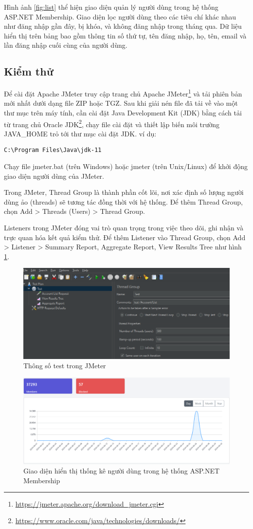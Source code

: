 \documentclass{article}[14pt]
\begin{document}
Hình ảnh \ref{fig:list} thể hiện giao diện quản lý người dùng trong hệ thống ASP.NET Membership. Giao diện lọc người dùng theo các tiêu chí khác nhau như đăng nhập gần đây, bị khóa, và không đăng nhập trong tháng qua. Dữ liệu hiển thị trên bảng bao gồm thông tin số thứ tự, tên đăng nhập, họ, tên, email và lần đăng nhập cuối cùng của người dùng.

\subsection{Kiểm thử}

Để cài đặt Apache JMeter truy cập trang chủ Apache JMeter\footnote{\url{https://jmeter.apache.org/download_jmeter.cgi}} và tải phiên bản mới nhất dưới dạng file ZIP hoặc TGZ. Sau khi giải nén file đã tải về vào một thư mục trên máy tính, cần cài đặt Java Development Kit (JDK) bằng cách tải từ trang chủ Oracle JDK\footnote{\url{https://www.oracle.com/java/technologies/downloads/}}, chạy file cài đặt và thiết lập biến môi trường JAVA\_HOME trỏ tới thư mục cài đặt JDK. ví dụ: \begin{verbatim}C:\Program Files\Java\jdk-11\end{verbatim}

Chạy file jmeter.bat (trên Windows) hoặc jmeter (trên Unix/Linux) để khởi động giao diện người dùng của JMeter.

Trong JMeter, Thread Group là thành phần cốt lõi, nơi xác định số lượng người dùng ảo (threads) sẽ tương tác đồng thời với hệ thống. Để thêm Thread Group, chọn Add > Threads (Users) > Thread Group.

Listeners trong JMeter đóng vai trò quan trọng trong việc theo dõi, ghi nhận và trực quan hóa kết quả kiểm thử. Để thêm Listener vào Thread Group, chọn Add > Listener > Summary Report, Aggregate Report, View Results Tree như hình \ref{fig:testjmeter}.


\begin{figure}
    \centering
    \includegraphics[width=0.5\linewidth]{images/testjmeter.png}
    \caption{Thông số test trong JMeter}
    \label{fig:testjmeter}
\end{figure}

\begin{figure}
    \centering
    \includegraphics[width=0.5\linewidth]{images/day.png}
    \caption{Giao diện hiển thị thống kê người dùng trong hệ thống ASP.NET Membership}
    \label{fig:day}
\end{figure}
\end{document}
